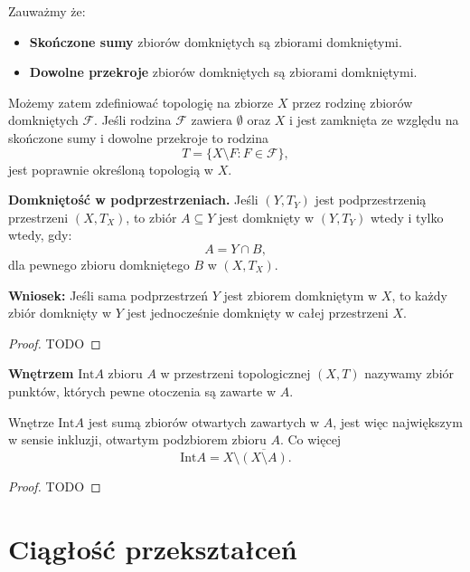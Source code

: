 \begin{remark}[1.2.19]
	Zauważmy że:
	\begin{itemize}
		\item \textbf{Skończone sumy} zbiorów domkniętych są zbiorami domkniętymi.
		\item \textbf{Dowolne przekroje} zbiorów domkniętych są zbiorami domkniętymi.
	\end{itemize}
	Możemy zatem zdefiniować topologię na zbiorze $X$ przez rodzinę zbiorów domkniętych $\mathcal{F}$. Jeśli rodzina $\mathcal{F}$ zawiera $\emptyset$ oraz $X$ i jest zamknięta ze względu na skończone sumy i dowolne przekroje to rodzina 
	 \[
	T = \{X\setminus F: F \in \mathcal{F}\} 
	,\] 
	jest poprawnie określoną topologią w $X$.

\noindent \textbf{Domkniętość w podprzestrzeniach.} Jeśli $\left( Y, T_{Y} \right) $ jest podprzestrzenią przestrzeni $\left( X,T_{X} \right) $, to zbiór $A \subseteq Y$ jest domknięty w $\left( Y, T_{Y} \right) $ wtedy i tylko wtedy, gdy:
\[
A = Y \cap B
,\] 
dla pewnego zbioru domkniętego $B$ w $\left( X,T_{X} \right) $.

\noindent \textbf{Wniosek:} Jeśli sama podprzestrzeń $Y$ jest zbiorem domkniętym w $X$, to każdy zbiór domknięty w $Y$ jest jednocześnie domknięty w całej przestrzeni $X$.
\end{remark}
\begin{proof}
	TODO
\end{proof} 

\begin{definition}
	\textbf{Wnętrzem} $\text{Int}A$ zbioru $A$ w przestrzeni topologicznej  $\left( X,T \right) $ nazywamy zbiór punktów, których pewne otoczenia są zawarte w $A$.
\end{definition} 
\begin{remark}[1.2.20]
	Wnętrze $\text{Int}A$ jest sumą zbiorów otwartych zawartych w $A$, jest więc największym w sensie inkluzji, otwartym podzbiorem zbioru $A$. Co więcej \[
	\text{Int}A = X\setminus \overline{\left( X\setminus A \right) }
	.\] 
\end{remark} 
\begin{proof}
	TODO
\end{proof} 
\section{Ciągłość przekształceń}

